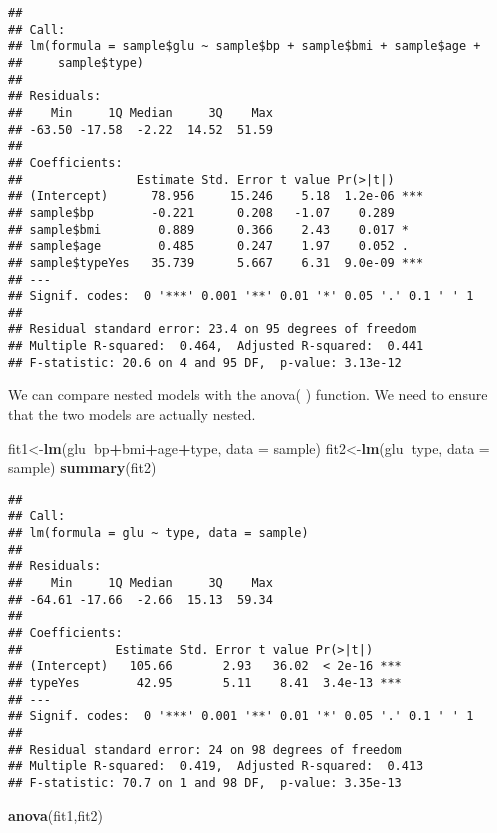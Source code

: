 \documentclass[]{book}
\newenvironment{Shaded}{\begin{snugshade}}{\end{snugshade}}
\newcommand{\KeywordTok}[1]{\textcolor[rgb]{0.13,0.29,0.53}{\textbf{#1}}}
\newcommand{\DataTypeTok}[1]{\textcolor[rgb]{0.13,0.29,0.53}{#1}}
\newcommand{\OperatorTok}[1]{\textcolor[rgb]{0.81,0.36,0.00}{\textbf{#1}}}
\newcommand{\NormalTok}[1]{#1}
\theoremstyle{definition}
\theoremstyle{definition}
\theoremstyle{definition}
\theoremstyle{remark}
\begin{document}
\begin{verbatim}
## 
## Call:
## lm(formula = sample$glu ~ sample$bp + sample$bmi + sample$age + 
##     sample$type)
## 
## Residuals:
##    Min     1Q Median     3Q    Max 
## -63.50 -17.58  -2.22  14.52  51.59 
## 
## Coefficients:
##                Estimate Std. Error t value Pr(>|t|)    
## (Intercept)      78.956     15.246    5.18  1.2e-06 ***
## sample$bp        -0.221      0.208   -1.07    0.289    
## sample$bmi        0.889      0.366    2.43    0.017 *  
## sample$age        0.485      0.247    1.97    0.052 .  
## sample$typeYes   35.739      5.667    6.31  9.0e-09 ***
## ---
## Signif. codes:  0 '***' 0.001 '**' 0.01 '*' 0.05 '.' 0.1 ' ' 1
## 
## Residual standard error: 23.4 on 95 degrees of freedom
## Multiple R-squared:  0.464,  Adjusted R-squared:  0.441 
## F-statistic: 20.6 on 4 and 95 DF,  p-value: 3.13e-12
\end{verbatim}

We can compare nested models with the anova( ) function. We need to
ensure that the two models are actually nested.

\begin{Shaded}
\begin{Highlighting}[]
\NormalTok{fit1<-}\KeywordTok{lm}\NormalTok{(glu}\OperatorTok{~}\NormalTok{bp}\OperatorTok{+}\NormalTok{bmi}\OperatorTok{+}\NormalTok{age}\OperatorTok{+}\NormalTok{type, }\DataTypeTok{data =}\NormalTok{ sample)}
\NormalTok{fit2<-}\KeywordTok{lm}\NormalTok{(glu}\OperatorTok{~}\NormalTok{type, }\DataTypeTok{data =}\NormalTok{ sample)}
\KeywordTok{summary}\NormalTok{(fit2)}
\end{Highlighting}
\end{Shaded}

\begin{verbatim}
## 
## Call:
## lm(formula = glu ~ type, data = sample)
## 
## Residuals:
##    Min     1Q Median     3Q    Max 
## -64.61 -17.66  -2.66  15.13  59.34 
## 
## Coefficients:
##             Estimate Std. Error t value Pr(>|t|)    
## (Intercept)   105.66       2.93   36.02  < 2e-16 ***
## typeYes        42.95       5.11    8.41  3.4e-13 ***
## ---
## Signif. codes:  0 '***' 0.001 '**' 0.01 '*' 0.05 '.' 0.1 ' ' 1
## 
## Residual standard error: 24 on 98 degrees of freedom
## Multiple R-squared:  0.419,  Adjusted R-squared:  0.413 
## F-statistic: 70.7 on 1 and 98 DF,  p-value: 3.35e-13
\end{verbatim}

\begin{Shaded}
\begin{Highlighting}[]
\KeywordTok{anova}\NormalTok{(fit1,fit2)}
\end{Highlighting}
\end{Shaded}
\end{document}

